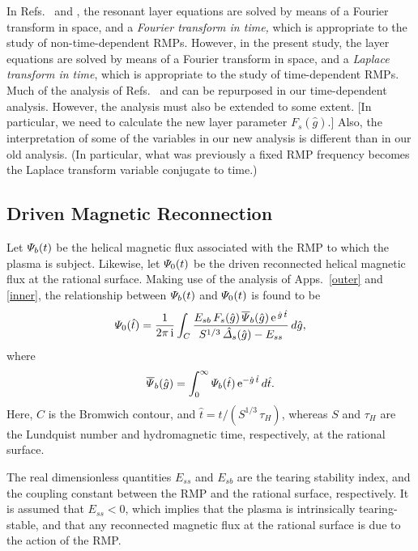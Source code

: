 \documentclass[12pt,prb,aps]{revtex4-1}
\begin{document}
In Refs.~ and , the resonant layer equations are solved by means of a Fourier transform in space, and a {\em Fourier transform in time,}
which is appropriate to the study of non-time-dependent RMPs. However, in the present study, the layer equations are solved by means of a Fourier transform in
space, and a {\em Laplace transform in time}, which is appropriate to the study of time-dependent RMPs. Much of the analysis of Refs.~ and 
can be repurposed in our time-dependent analysis. However, the analysis must also be extended to some extent. [In particular, we need to calculate the
new layer parameter $F_s(\hat{g})$.] Also, the interpretation of some of the variables in our new analysis is different than in our old analysis. (In particular,
what was previously a fixed RMP frequency becomes the Laplace transform variable conjugate to time.)

\subsection{Driven Magnetic Reconnection}
Let ${\mit\Psi}_b(t)$ be the helical magnetic flux associated with the RMP to which the plasma is
subject. Likewise, let ${\mit\Psi}_0(t)$ be the driven reconnected helical magnetic flux at the rational surface. 
Making use of the analysis of Apps.~\ref{outer} and \ref{inner}, the relationship between ${\mit\Psi}_b(t)$ and ${\mit\Psi}_0(t)$ is found to be
\begin{equation}\label{drive}
{\mit\Psi}_0(\hat{t}) = \frac{1}{2\pi\,{\rm i}}\int_C \frac{E_{sb}\,F_s(\hat{g})\,\overline{\mit\Psi}_b(\hat{g})\,{\rm e}^{\,\hat{g}\,\hat{t}}}{S^{1/3}\,\hat{\mit\Delta}_s(\hat{g})-E_{ss}}\,d\hat{g},
\end{equation}
where
\begin{equation}\label{psibx}
\overline{\mit\Psi}_b(\hat{g}) = \int_0^\infty {\mit\Psi}_b(\hat{t})\,{\rm e}^{-\hat{g}\,\hat{t}}\,d\hat{t}.
\end{equation}
Here, $C$ is the Bromwich contour, and 
$\hat{t} =t/(S^{1/3}\,\tau_H)$,
whereas $S$ and $\tau_H$ are the Lundquist number and hydromagnetic time, respectively, at the rational surface. 

The real dimensionless quantities $E_{ss}$ and $E_{sb}$
are the tearing stability index, and the coupling constant between the RMP and the rational surface, respectively.\cite{ric3,spk} It is assumed that
$E_{ss}<0$, which implies that the plasma is intrinsically tearing-stable, and that any reconnected magnetic flux at the rational surface is due to the action of the RMP. 
\end{document}
